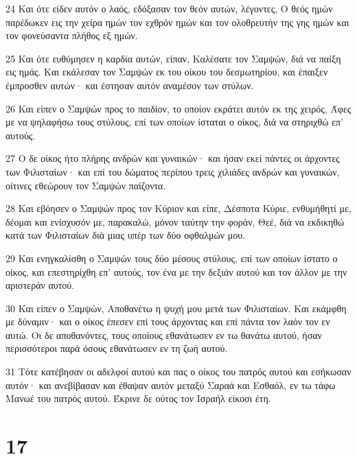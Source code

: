 \par 24 Και ότε είδεν αυτόν ο λαός, εδόξασαν τον θεόν αυτών, λέγοντες, Ο θεός ημών παρέδωκεν εις την χείρα ημών τον εχθρόν ημών και τον ολοθρευτήν της γης ημών και τον φονεύσαντα πλήθος εξ ημών.
\par 25 Και ότε ευθύμησεν η καρδία αυτών, είπαν, Καλέσατε τον Σαμψών, διά να παίξη εις ημάς. Και εκάλεσαν τον Σαμψών εκ του οίκου του δεσμωτηρίου, και έπαιξεν έμπροσθεν αυτών· και έστησαν αυτόν αναμέσον των στύλων.
\par 26 Και είπεν ο Σαμψών προς το παιδίον, το οποίον εκράτει αυτόν εκ της χειρός, Άφες με να ψηλαφήσω τους στύλους, επί των οποίων ίσταται ο οίκος, διά να στηριχθώ επ' αυτούς.
\par 27 Ο δε οίκος ήτο πλήρης ανδρών και γυναικών· και ήσαν εκεί πάντες οι άρχοντες των Φιλισταίων· και επί του δώματος περίπου τρεις χιλιάδες ανδρών και γυναικών, οίτινες εθεώρουν τον Σαμψών παίζοντα.
\par 28 Και εβόησεν ο Σαμψών προς τον Κύριον και είπε, Δέσποτα Κύριε, ενθυμήθητί με, δέομαι και ενίσχυσόν με, παρακαλώ, μόνον ταύτην την φοράν, Θεέ, διά να εκδικηθώ κατά των Φιλισταίων διά μιας υπέρ των δύο οφθαλμών μου.
\par 29 Και ενηγκαλίσθη ο Σαμψών τους δύο μέσους στύλους, επί των οποίων ίστατο ο οίκος, και επεστηρίχθη επ' αυτούς, τον ένα με την δεξιάν αυτού και τον άλλον με την αριστεράν αυτού.
\par 30 Και είπεν ο Σαμψών, Αποθανέτω η ψυχή μου μετά των Φιλισταίων. Και εκάμφθη με δύναμιν· και ο οίκος έπεσεν επί τους άρχοντας και επί πάντα τον λαόν τον εν αυτώ. Οι δε αποθανόντες, τους οποίους εθανάτωσεν εν τω θανάτω αυτού, ήσαν περισσότεροι παρά όσους εθανάτωσεν εν τη ζωή αυτού.
\par 31 Τότε κατέβησαν οι αδελφοί αυτού και πας ο οίκος του πατρός αυτού και εσήκωσαν αυτόν· και ανεβίβασαν και έθαψαν αυτόν μεταξύ Σαραά και Εσθαόλ, εν τω τάφω Μανωέ του πατρός αυτού. Έκρινε δε ούτος τον Ισραήλ είκοσι έτη.

\chapter{17}

